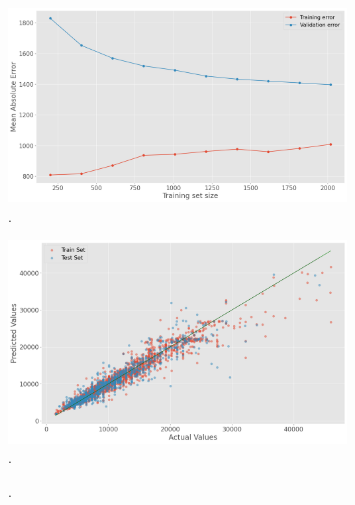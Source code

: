 \begin{figure}
\centering
    \includegraphics[width=0.8\textwidth]{"content/pics/Learning_curve.png"}
    \caption{.}
    \label{fig:}
\end{figure}

\begin{figure}
\centering
    \includegraphics[width=0.8\textwidth]{"content/pics/Predictionerrorplot.png"}
    \caption{.}
    \label{fig:}
\end{figure}



\begin{figure}
\centering
    \caption{.}
    \label{fig:}
\end{figure}



